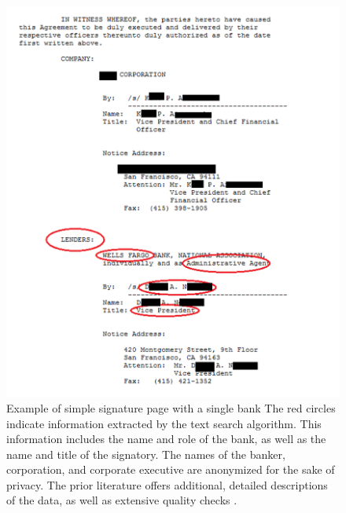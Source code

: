



\begin{figure}[H]
	\caption{Example of simple signature page with a single bank \newline
		The red circles indicate information extracted by the text search algorithm. This information includes the name and role of the bank, as well as the name and title of the signatory. The names of the banker, corporation, and corporate executive are anonymized for the sake of privacy. The prior literature offers additional, detailed descriptions of the data, as well as extensive quality checks \citep[e.g.][]{Herpfer.2018, Bushman2019}.}
	\label{fig:signature}
	\centering
	\includegraphics[angle=0,  scale=0.8]{figures/signature_well_formated.png}
\end{figure}

\clearpage \newpage


